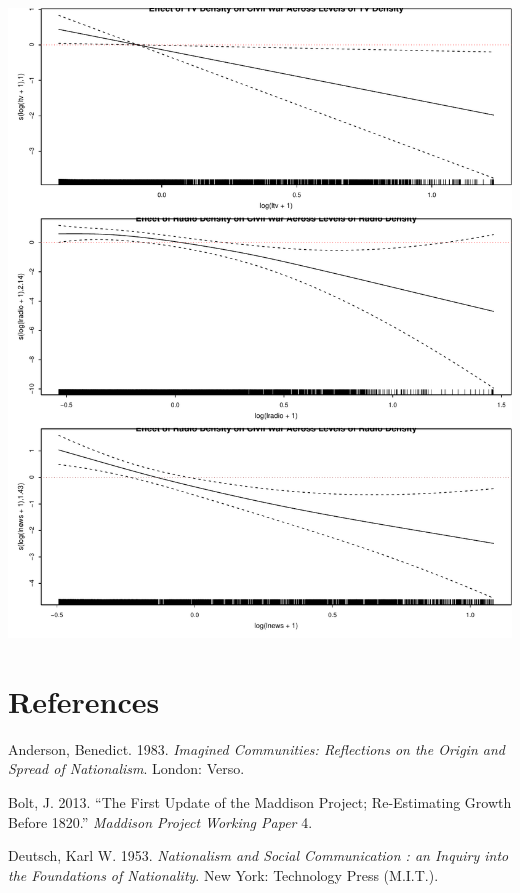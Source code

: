 \documentclass[11pt,article,oneside]{memoir}
\makeatletter
\def\maxwidth{\ifdim\Gin@nat@width>\linewidth\linewidth
\else\Gin@nat@width\fi}
\let\Oldincludegraphics\includegraphics
\renewcommand{\includegraphics}[1]{\Oldincludegraphics[width=\maxwidth]{#1}}
\makeatother
\begin{document}
\includegraphics{./media_civil_war_files/figure-markdown/disaggregated-nonlinear.pdf}
\pagebreak   

\section{References}\label{references}

\setlength{\parindent}{-0.2in} \setlength{\leftskip}{0.2in}
\setlength{\parskip}{8pt} \vspace*{-0.2in} \noindent

Anderson, Benedict. 1983. \emph{Imagined Communities: Reflections on the
Origin and Spread of Nationalism}. London: Verso.

Bolt, J. 2013. ``The First Update of the Maddison Project; Re-Estimating
Growth Before 1820.'' \emph{Maddison Project Working Paper} 4.

Deutsch, Karl W. 1953. \emph{Nationalism and Social Communication : an
Inquiry into the Foundations of Nationality}. New York: Technology Press
(M.I.T.).
\end{document}

